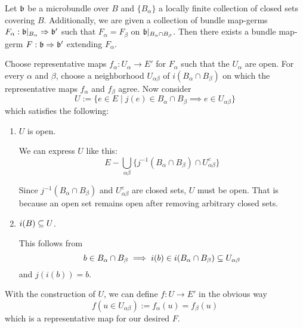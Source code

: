 \begin{mylemma}
    Let $\mathfrak{b}$ be a microbundle over $B$ and $\{B_\alpha\}$ a locally finite collection of closed sets covering $B$.
    Additionally, we are given a collection of bundle map-germs $F_\alpha: \mathfrak{b}\vert_{B_\alpha} \Rightarrow \mathfrak{b}'$
    such that $F_\alpha = F_\beta$ on $\mathfrak{b}\vert_{B_\alpha \cap B_\beta}$.
    Then there exists a bundle map-germ $F: \mathfrak{b} \Rightarrow \mathfrak{b}'$ extending $F_\alpha$.
\end{mylemma}
\begin{myproof}
    Choose representative maps $f_\alpha: U_\alpha \to E'$ for $F_\alpha$ such that the $U_\alpha$ are open.
    For every $\alpha$ and $\beta$, choose a neighborhood $U_{\alpha\beta}$ of $i(B_\alpha \cap B_\beta)$ on which the representative maps $f_\alpha$ and $f_\beta$ agree.
    Now consider
    \[ U := \{ e \in E \mid j(e) \in B_\alpha \cap B_\beta \implies e \in U_{\alpha\beta} \}\]
    which satisfies the following:
    \begin{enumerate}
        \item $U$ is open.

        We can express $U$ like this:
        \[ E - \bigcup_{\alpha\beta} \{ j^{-1}(B_\alpha \cap B_\beta) \cap U_{\alpha\beta}^c \} \]
        
        Since $j^{-1}(B_\alpha \cap B_\beta)$ and $U_{\alpha\beta}^c$ are closed sets, $U$ must be open.
        That is because an open set remains open after removing arbitrary closed sets.
        \item $i(B) \subseteq{} U$.
        
        This follows from
        \[ b \in B_\alpha \cap B_\beta \implies i(b) \in i(B_\alpha \cap B_\beta) \subseteq{} U_{\alpha\beta} \]
        and $j(i(b)) = b$.
    \end{enumerate}
    With the construction of $U$, we can define $f: U \to E'$ in the obvious way
    \[ f(u \in U_{\alpha\beta}) := f_\alpha(u) = f_\beta(u) \]
    which is a representative map for our desired $F$.
\end{myproof}